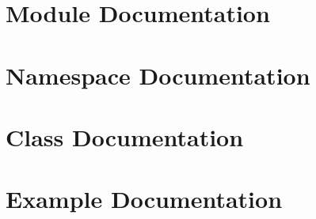 \documentclass[twoside]{book}
\begin{document}
\chapter{Module Documentation}




\chapter{Namespace Documentation}

\chapter{Class Documentation}

\chapter{Example Documentation}





\newpage
{}
{}
\printindex
\end{document}
